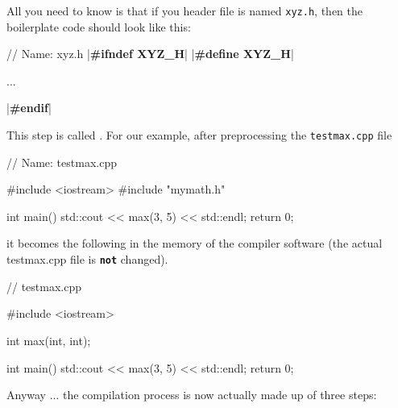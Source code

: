 All you need to know is that if you header file is named \texttt{xyz.h},
then the boilerplate code should look like this:

\begin{consolethree}[escapeinside=||]
// Name: xyz.h
|\textbf{\#ifndef XYZ\_H}|
|\textbf{\#define XYZ\_H}|

...

|\textbf{\#endif}|
\end{consolethree}

This step is called . For our example, after
preprocessing the \texttt{testmax.cpp} file

\begin{consolethree}[escapeinside=||]
// Name: testmax.cpp

#include <iostream>
#include "mymath.h"

int main()
{
    std::cout << max(3, 5) << std::endl;
    return 0;
}
\end{consolethree}

it becomes the following in the memory of the compiler software (the
actual testmax.cpp file is \textbf{\texttt{not}} changed).

\begin{consolethree}[escapeinside=||]
// testmax.cpp

#include <iostream>

int max(int, int);

int main()
{
    std::cout << max(3, 5) << std::endl;
    return 0;
}
\end{consolethree}

Anyway ... the compilation process is now actually made up of three steps:

